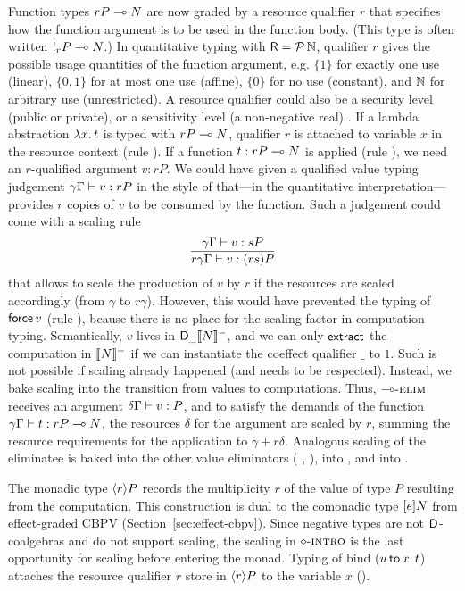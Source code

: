 \documentclass[acmsmall,review,anonymous]{acmart}\settopmatter{printfolios=true,printccs=false,printacmref=false}
\begin{document}
Function types $\qfun r P N$ are now graded by a resource qualifier
$r$ that specifies how the function argument is to be used in the
function body.  (This type is often written $!_{r}P \lolli N$.)  In
quantitative typing with $\R = \Pot \bN$, qualifier $r$ gives the
possible usage quantities of the function argument, e.g. $\{1\}$ for
exactly one use (linear), $\{0,1\}$ for at most one use (affine),
$\{0\}$ for no use (constant), and $\bN$ for arbitrary use
(unrestricted).  A resource qualifier could also be a security level
(public or private), or a sensitivity level (a non-negative real)
\citep{reedPierce:icfp10}.  If a lambda abstraction $\lam x t$ is
typed with $\qfun r P N$, qualifier $r$ is attached to variable $x$ in
the resource context (rule \rintro\lolli).  If a function
$t : \qfun r P N$ is applied (rule \relim\lolli), we need an
$r$-qualified argument $v : rP$.  We could have given a qualified
value typing judgement $\qValTy \gamma \Gamma v {rP}$ in the style of
\citet{mcBride:wadler60} that---in the quantitative
interpretation---provides $r$ copies of $v$ to be consumed by the
function.  Such a judgement could come with a scaling rule
\[
\ru{\qValTy \gamma \Gamma v {sP}
  }{\qValTy{r\gamma}\Gamma v {(rs)P}}
\]
that allows to scale the production of $v$ by $r$ if the resources are
scaled accordingly (from $\gamma$ to $r\gamma$).
%
However, this would have prevented the typing of $\force v$ (rule
\relim\Box), bcause there is no place for the scaling factor in
computation typing.  Semantically, $v$ lives in $\D[\_]\denn N$, and
we can only $\textract$ the computation in $\denn N$ if we can
instantiate the coeffect qualifier $\_$ to $1$.  Such is not possible
if scaling already happened (and needs to be respected).
%
Instead, we bake scaling
into the transition from values to computations.
Thus, $\relim\lolli$ receives an
argument $\qValTy \delta \Gamma v P$, and to satisfy the demands of
the function $\qCompTy \gamma \Gamma t {\qfun r P N}$, the resources
$\delta$ for the argument are scaled by $r$, summing the resource
requirements for the application to $\gamma + r\delta$.
%
Analogous scaling of the eliminatee is baked into the other value
eliminators (%
\relim\GS, \relim\otimes), into %
 \rlet,
and into \rintro\diamond.

The monadic type $\compty r P$ records the multiplicity $r$ of the
value of type $P$ resulting from the computation.  This construction
is dual to the comonadic type $\thunkty e N$ from effect-graded CBPV
(Section~\ref{sec:effect-cbpv}).  Since negative types are not
$\D$-coalgebras and do not support scaling, the scaling in
$\rintro\diamond$ is the last opportunity for scaling before entering
the monad.  Typing of bind ($\bind x u t$) attaches the resource qualifier $r$ store in $\compty r P$ to the variable $x$ (\relim\diamond).
\end{document}
